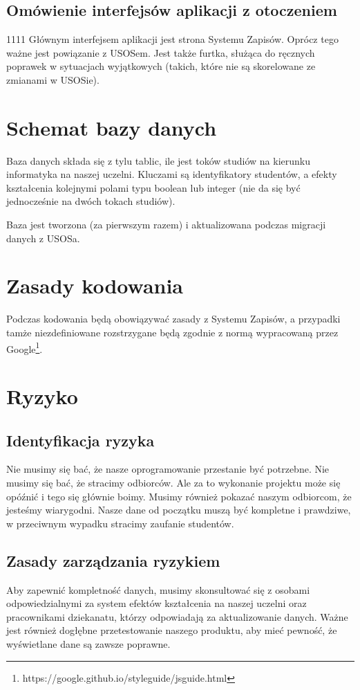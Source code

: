 \documentclass{article}
\begin{document}
\subsection{Omówienie interfejsów aplikacji z otoczeniem}1111
Głównym interfejsem aplikacji jest strona Systemu Zapisów. Oprócz tego ważne jest powiązanie z USOSem. Jest także furtka, służąca do ręcznych poprawek w sytuacjach wyjątkowych (takich, które nie są skorelowane ze zmianami w USOSie).

\section{Schemat bazy danych}
Baza danych składa się z tylu tablic, ile jest toków studiów na kierunku informatyka na naszej uczelni. Kluczami są identyfikatory studentów, a efekty kształcenia kolejnymi polami typu boolean lub integer (nie da się być jednocześnie na dwóch tokach studiów).

Baza jest tworzona (za pierwszym razem) i aktualizowana podczas migracji danych z USOSa.

\section{Zasady kodowania}
Podczas kodowania będą obowiązywać zasady z Systemu Zapisów, a przypadki tamże niezdefiniowane rozstrzygane będą zgodnie z normą wypracowaną przez Google\footnote{https://google.github.io/styleguide/jsguide.html}.

\section{Ryzyko}

\subsection{Identyfikacja ryzyka}
Nie musimy się bać, że nasze oprogramowanie przestanie być potrzebne. Nie musimy się bać, że stracimy odbiorców. Ale za to wykonanie projektu może się opóźnić i tego się głównie boimy.
Musimy również pokazać naszym odbiorcom, że jesteśmy wiarygodni. Nasze dane od początku muszą być kompletne i prawdziwe, w przeciwnym wypadku stracimy zaufanie studentów.

\subsection{Zasady zarządzania ryzykiem}
Aby zapewnić kompletność danych, musimy skonsultować się z osobami odpowiedzialnymi za system efektów kształcenia na naszej uczelni oraz pracownikami dziekanatu, którzy odpowiadają
za aktualizowanie danych. Ważne jest również dogłębne przetestowanie naszego produktu, aby mieć pewność, że wyświetlane dane są zawsze poprawne.
\end{document}
